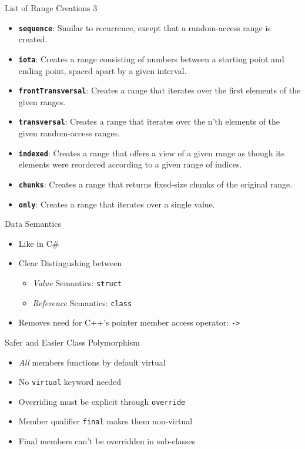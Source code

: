 \documentclass[xcolor=dvipsnames]{beamer}
\begin{document}
\begin{frame}[fragile]{List of Range Creations 3}
  \begin{itemize}[<+->]
  \item \textbf{\texttt{sequence}}: Similar to recurrence, except that a random-access
    range is created.
  \item \textbf{\texttt{iota}}: Creates a range consisting of numbers between a starting
    point and ending point, spaced apart by a given interval.
  \item \textbf{\texttt{frontTransversal}}: Creates a range that iterates over the first
    elements of the given ranges.
  \item \textbf{\texttt{transversal}}: Creates a range that iterates over the n'th
    elements of the given random-access ranges.
  \item \textbf{\texttt{indexed}}: Creates a range that offers a view of a given range as
    though its elements were reordered according to a given range of indices.
  \item \textbf{\texttt{chunks}}: Creates a range that returns fixed-size chunks of the
    original range.
  \item \textbf{\texttt{only}}: Creates a range that iterates over a single value.
  \end{itemize}
\end{frame}

\begin{frame}[fragile]{Data Semantics}
  \begin{itemize}[<+->]
  \item Like in C\#
  \item Clear Distingushing between
    \begin{itemize}[<+->]
    \item \emph{Value} Semantics: \texttt{struct}
    \item \emph{Reference} Semantics: \texttt{class}
    \end{itemize}
  \item Removes need for C++'s pointer member access operator: \texttt{->}
  \end{itemize}
\end{frame}

\begin{frame}[fragile]{Safer and Easier Class Polymorphism}
  \begin{itemize}[<+->]
  \item \emph{All} members functions by default virtual
  \item No \texttt{virtual} keyword needed
  \item Overriding must be explicit through \texttt{override}
  \item Member qualifier \texttt{final} makes them non-virtual
  \item Final members can't be overridden in sub-classes
  \end{itemize}
\end{frame}
\end{document}
